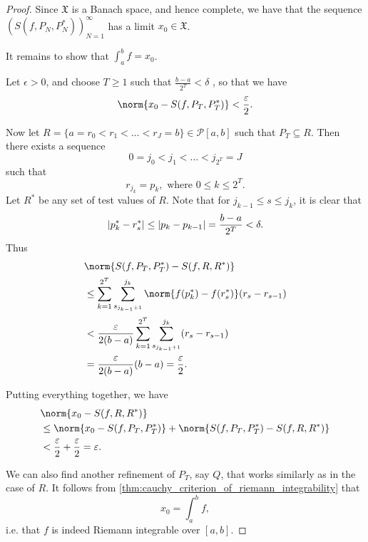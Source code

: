 \documentclass[notoc,notitlepage]{tufte-book}
\begin{document}
\begin{proof}
  Since $\mathfrak{X}$ is a Banach space, and hence complete, we have that the
  sequence $(S(f, P_N, P_N^*))_{N=1}^{\infty}$ has a limit $x_0 \in \mathfrak{X}$.

  It remains to show that $\int_{a}^{b} f = x_0$. 

  Let $\epsilon > 0$, and choose $T \geq 1$ such that $\frac{b - a}{2^T} <
  \delta$ , so that we have
  \begin{equation*}
    \norm{x_0 - S(f, P_T, P_T^*)} < \frac{\epsilon}{2}.
  \end{equation*}

  Now let $R = \{a = r_0 < r_1 < \hdots < r_J = b \} \in \mathcal{P}[a, b]$ such
  that $P_T \subseteq R$. Then there exists a sequence
  \begin{equation*}
    0 = j_0 < j_1 < \hdots < j_{2^T} = J
  \end{equation*}
  such that
  \begin{equation*}
    r_{j_k} = p_k, \text{ where } 0 \leq k \leq 2^T.
  \end{equation*}
  Let $R^*$ be any set of test values of $R$. Note that for $j_{k-1} \leq s \leq
  j_k$, it is clear that
  \begin{equation*}
    \left|p_k^* - r_s^*\right| \leq \left|p_k - p_{k-1}\right| = \frac{b-a}{2^T} < \delta.
  \end{equation*}
  Thus
  \begin{align*}
    &\norm{S(f, P_T, P_T^*) - S(f, R, R^*)} \\
    &\leq \sum_{k=1}^{2^T} \sum_{s_{j_{k-1}+1}}^{j_k} \norm{f(p_k^*) -
      f(r_s^*)}(r_s - r_{s - 1}) \\
    &< \frac{\epsilon}{2(b-a)} \sum_{k=1}^{2^T} \sum_{s_{j_{k-1}+1}}^{j_k}
      (r_s - r_{s-1}) \\
    &= \frac{\epsilon}{2(b - a)}(b - a) = \frac{\epsilon}{2}.
  \end{align*}

  Putting everything together, we have
  \begin{align*}
    &\norm{x_0 - S(f, R, R^*)} \\
    &\leq \norm{x_0 - S(f, P_T, P_T^*)} + \norm{S(f, P_T, P_T^*) - S(f, R, R^*)}
      \\
    &< \frac{\epsilon}{2} + \frac{\epsilon}{2} = \epsilon.
  \end{align*}

  We can also find another refinement of $P_T$, say $Q$, that works similarly
  as in the case of $R$. It follows from
  \cref{thm:cauchy_criterion_of_riemann_integrability} that
  \begin{equation*}
    x_0 = \int_{a}^{b} f,
  \end{equation*}
  i.e. that $f$ is indeed Riemann integrable over $[a, b]$.
\end{proof}
\end{document}
